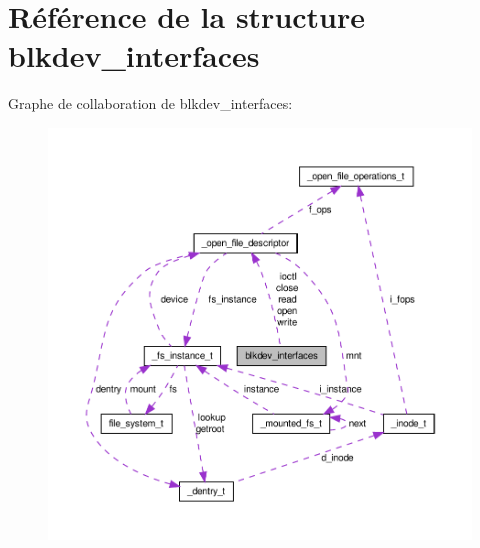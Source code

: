 \hypertarget{structblkdev__interfaces}{\section{Référence de la structure blkdev\-\_\-interfaces}
\label{structblkdev__interfaces}
}


Graphe de collaboration de blkdev\-\_\-interfaces\-:
\nopagebreak
\begin{figure}[H]
\begin{center}
\leavevmode
\includegraphics[width=350pt]{structblkdev__interfaces__coll__graph}
\end{center}
\end{figure}
